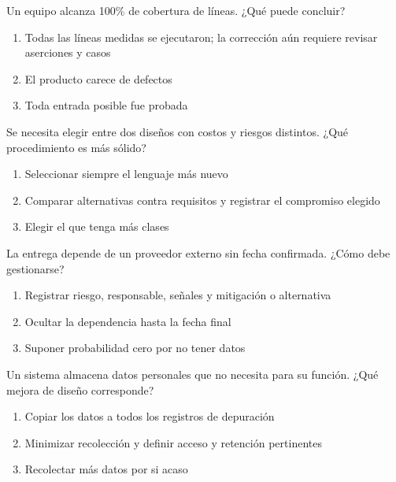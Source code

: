 \noindent\begin{minipage}{\linewidth}\setlength{\parskip}{4pt}\label{q:S-028}
Un equipo alcanza 100\% de cobertura de líneas. ¿Qué puede concluir?
\begin{enumerate}[label=\Alph*),nosep]
\item Todas las líneas medidas se ejecutaron; la corrección aún requiere revisar aserciones y casos
\item El producto carece de defectos
\item Toda entrada posible fue probada
\end{enumerate}\end{minipage}\par\medskip

\noindent\begin{minipage}{\linewidth}\setlength{\parskip}{4pt}\label{q:S-029}
Se necesita elegir entre dos diseños con costos y riesgos distintos. ¿Qué procedimiento es más sólido?
\begin{enumerate}[label=\Alph*),nosep]
\item Seleccionar siempre el lenguaje más nuevo
\item Comparar alternativas contra requisitos y registrar el compromiso elegido
\item Elegir el que tenga más clases
\end{enumerate}\end{minipage}\par\medskip

\noindent\begin{minipage}{\linewidth}\setlength{\parskip}{4pt}\label{q:S-030}
La entrega depende de un proveedor externo sin fecha confirmada. ¿Cómo debe gestionarse?
\begin{enumerate}[label=\Alph*),nosep]
\item Registrar riesgo, responsable, señales y mitigación o alternativa
\item Ocultar la dependencia hasta la fecha final
\item Suponer probabilidad cero por no tener datos
\end{enumerate}\end{minipage}\par\medskip

\noindent\begin{minipage}{\linewidth}\setlength{\parskip}{4pt}\label{q:S-031}
Un sistema almacena datos personales que no necesita para su función. ¿Qué mejora de diseño corresponde?
\begin{enumerate}[label=\Alph*),nosep]
\item Copiar los datos a todos los registros de depuración
\item Minimizar recolección y definir acceso y retención pertinentes
\item Recolectar más datos por si acaso
\end{enumerate}\end{minipage}\par\medskip

